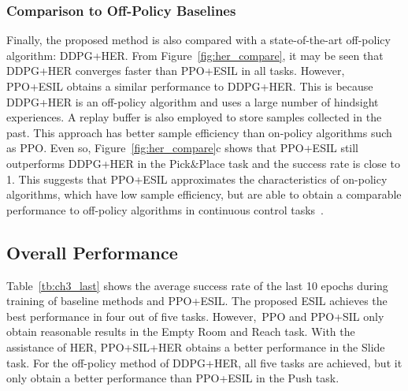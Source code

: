 \subsubsection{Comparison to Off-Policy Baselines}
Finally, {the proposed method is also compared} with a state-of-the-art off-policy algorithm: DDPG+HER. From {Figure~\ref{fig:her_compare}, it may be seen that} DDPG+HER converges faster than PPO+ESIL in all tasks. {However, PPO+ESIL obtains a similar performance to DDPG+HER. This is because DDPG+HER is an off-policy algorithm and uses a large number of hindsight experiences. A replay buffer is also employed to store  samples collected in the past. This approach has better sample efficiency than on-policy algorithms such as PPO.} Even so, {Figure~\ref{fig:her_compare}c} shows that PPO+ESIL still outperforms DDPG+HER in the Pick$\&$Place task and the success rate is close to 1. {This suggests that PPO+ESIL approximates the characteristics of on-policy algorithms, which have low sample efficiency, but are able to obtain a comparable performance to off-policy algorithms in continuous control tasks~\cite{schulman2017proximal}.}

\subsection{Overall Performance}
{Table~\ref{tb:ch3_last}} shows the average success rate of the last 10 epochs during training of baseline methods and PPO+ESIL. The proposed ESIL achieves the best performance in four out of five tasks. However,~PPO and PPO+SIL only obtain reasonable results in the Empty Room and Reach task. With the assistance of HER, PPO+SIL+HER obtains a better performance in the Slide task. {For the off-policy method of DDPG+HER, all five tasks are achieved, but it only obtain a better performance than PPO+ESIL in the Push task}.

